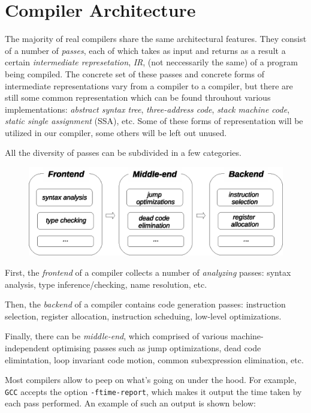 \documentclass{book}
\begin{document}
\section{Compiler Architecture}

The majority of real compilers share the same architectural features. They consist of a number of \emph{passes}, each of which
takes as input and returns as a result a certain \emph{intermediate represetation}, \emph{IR}, (not neccessarily the same) of a program
being compiled. The concrete set of these passes and concrete forms of intermediate representations vary from a compiler to a compiler,
but there are still some common representation which can be found throuhout various implementations: \emph{abstract syntax tree},
\emph{three-address code}, \emph{stack machine code}, \emph{static single assignment} (SSA), etc. Some of these forms of representation
will be utilized in our compiler, some others will be left out unused.

All the diversity of passes can be subdivided in a few categories.

\begin{figure}[h]
  \centering
  \includegraphics[scale=0.7]{images/01-06.eps}
\end{figure}

First, the \emph{frontend} of a compiler collects a number of \emph{analyzing} passes: syntax analysis, type inference/checking,
name resolution, etc.

Then, the \emph{backend} of a compiler contains code generation passes: instruction selection, register allocation,
instruction scheduing, low-level optimizations.

Finally, there can be \emph{middle-end}, which comprised of various machine-independent optimising passes such as
jump optimizations, dead code elimintation, loop invariant code motion, common subexpression elimination, etc.

Most compilers allow to peep on what's going on under the hood. For example, \texttt{GCC} accepts the
option \texttt{-ftime-report}, which makes it output the time taken by each pass performed. An example
of such an output is shown below:
\end{document}
